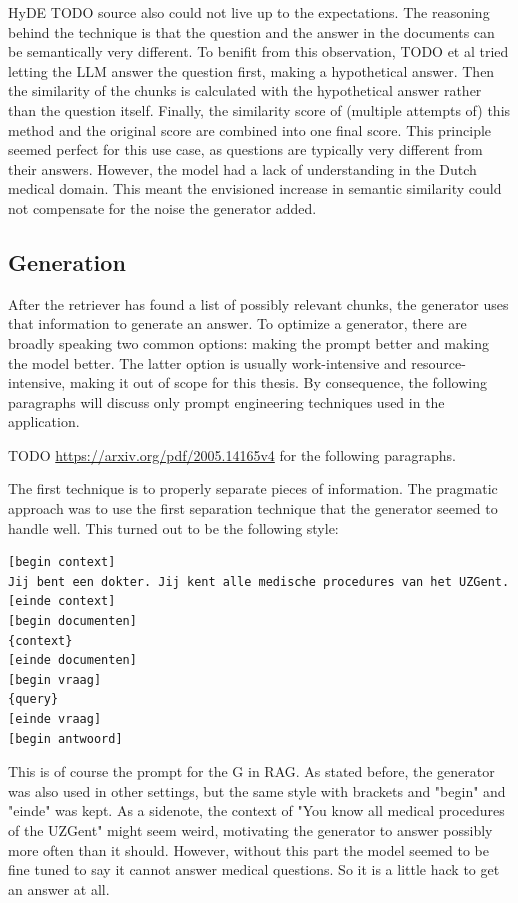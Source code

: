 HyDE TODO source also could not live up to the expectations. The reasoning behind the technique is that the question and the answer in the documents can be semantically very different. To benifit from this observation, TODO et al tried letting the LLM answer the question first, making a hypothetical answer. Then the similarity of the chunks is calculated with the hypothetical answer rather than the question itself. Finally, the similarity score of (multiple attempts of) this method and the original score are combined into one final score. This principle seemed perfect for this use case, as questions are typically very different from their answers. However, the model had a lack of understanding in the Dutch medical domain. This meant the envisioned increase in semantic similarity could not compensate for the noise the generator added.

\subsection{Generation}
After the retriever has found a list of possibly relevant chunks, the generator uses that information to generate an answer. To optimize a generator, there are broadly speaking two common options: making the prompt better and making the model better. The latter option is usually work-intensive and resource-intensive, making it out of scope for this thesis. By consequence, the following paragraphs will discuss only prompt engineering techniques used in the application.

TODO \url{https://arxiv.org/pdf/2005.14165v4} for the following paragraphs.

The first technique is to properly separate pieces of information. The pragmatic approach was to use the first separation technique that the generator seemed to handle well. This turned out to be the following style:
\begin{verbatim}
[begin context]
Jij bent een dokter. Jij kent alle medische procedures van het UZGent.
[einde context]
[begin documenten]
{context}
[einde documenten]
[begin vraag]
{query}
[einde vraag]
[begin antwoord]
\end{verbatim}
This is of course the prompt for the G in RAG. As stated before, the generator was also used in other settings, but the same style with brackets and "begin" and "einde" was kept. As a sidenote, the context of "You know all medical procedures of the UZGent" might seem weird, motivating the generator to answer possibly more often than it should. However, without this part the model seemed to be fine tuned to say it cannot answer medical questions. So it is a little hack to get an answer at all.

